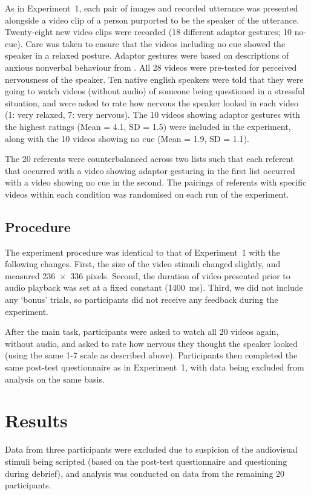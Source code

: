 \documentclass[a4paper,man,natbib]{apa6}
\begin{document}
As in Experiment~1, each pair of images and recorded utterance was presented alongside a video clip of a person purported to be the speaker of the utterance.
Twenty-eight new video clips were recorded (18 different adaptor gestures; 10 no-cue). 
Care was taken to ensure that the videos including no cue showed the speaker in a relaxed posture. 
Adaptor gestures were based on descriptions of anxious nonverbal behaviour from \citet{Gregersen2005}.
All 28 videos were pre-tested for perceived nervousness of the speaker.
Ten native english speakers were told that they were going to watch videos (without audio) of someone being questioned in a stressful situation, and were asked to rate how nervous the speaker looked in each video (1: very relaxed, 7: very nervous). 
The 10 videos showing adaptor gestures with the highest ratings (Mean = 4.1, SD = 1.5) were included in the experiment, along with the 10 videos showing no cue (Mean = 1.9, SD = 1.1).

The 20 referents were counterbalanced across two lists such that each referent that occurred with a video showing adaptor gesturing in the first list occurred with a video showing no cue in the second.
The pairings of referents with specific videos within each condition was randomised on each run of the experiment.

\subsection{Procedure}
The experiment procedure was identical to that of Experiment~1 with the following changes.
First, the size of the video stimuli changed slightly, and measured 236~$\times$~336 pixels.
Second, the duration of video presented prior to audio playback was set at a fixed constant (1400~ms).
Third, we did not include any `bonus' trials, so participants did not receive any feedback during the experiment.

After the main task, participants were asked to watch all 20 videos again, without audio, and asked to rate how nervous they thought the speaker looked (using the same 1-7 scale as described above).
Participants then completed the same post-test questionnaire as in Experiment~1, with data being excluded from analysis on the same basis.

\section{Results}
Data from three participants were excluded due to suspicion of the audiovisual stimuli being scripted (based on the post-test questionnaire and questioning during debrief), and analysis was conducted on data from the remaining 20 participants.
\end{document}
